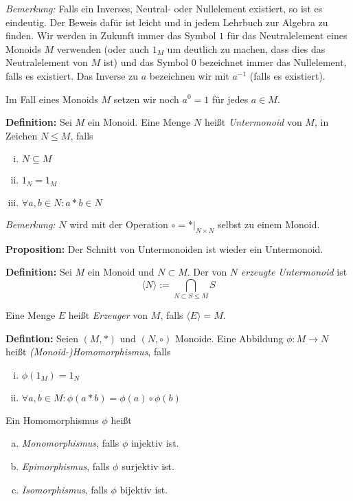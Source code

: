 \documentclass[a4paper, halfparskip*]{scrartcl}
\begin{document}
\textit{Bemerkung:} Falls ein Inverses, Neutral- oder Nullelement existiert,
so ist es eindeutig. Der Beweis dafür ist leicht und in jedem Lehrbuch zur
Algebra zu finden. Wir werden in Zukunft immer das Symbol $1$ für das
Neutralelement eines Monoids $M$ verwenden (oder auch $1_M$ um deutlich zu
machen, dass dies das Neutralelement von $M$ ist) und das Symbol $0$ bezeichnet
immer das Nullelement, falls es existiert. Das Inverse zu $a$ bezeichnen wir mit
$a^{-1}$ (falls es existiert).

Im Fall eines Monoids $M$ setzen wir noch $a^0 = 1$ für jedes $a\in M$.

\textbf{Definition:} Sei $M$ ein Monoid. Eine Menge $N$ heißt
\emph{Untermonoid} von $M$, in Zeichen $N\leq M$, falls
\begin{enumerate}[(i)]
\item $N \subseteq M$
\item $1_N = 1_M$
\item $\forall a,b\in N \colon a*b\in N$
\end{enumerate}

\textit{Bemerkung:} $N$ wird mit der Operation  $\circ = *|_{N\times N}$ selbst
zu einem Monoid.

\textbf{Proposition:} Der Schnitt von Untermonoiden ist wieder ein Untermonoid.

\textbf{Definition:} Sei $M$ ein Monoid und $N \subset M$. Der von $N$
\emph{erzeugte Untermonoid} ist
\begin{equation*}
  \langle N \rangle := \bigcap_{N \subset S \leq M} S
\end{equation*}

Eine Menge $E$ heißt \emph{Erzeuger} von $M$, falls $\langle E \rangle = M$.

\textbf{Defintion:} Seien $(M,*)$ und $(N,\circ)$ Monoide. Eine Abbildung $\phi\colon M \to
N$ heißt \emph{(Monoid-)Homomorphismus}, falls
\begin{enumerate}[(i)]
\item $\phi(1_M) = 1_N$
\item $\forall a,b \in M \colon \phi(a*b) = \phi(a)\circ\phi(b)$
\end{enumerate}
Ein Homomorphismus $\phi$ heißt
\begin{enumerate}[(a)]
\item \emph{Monomorphismus}, falls $\phi$ injektiv ist.
\item \emph{Epimorphismus}, falls $\phi$ surjektiv ist.
\item \emph{Isomorphismus}, falls $\phi$ bijektiv ist.
\end{enumerate}
\end{document}
